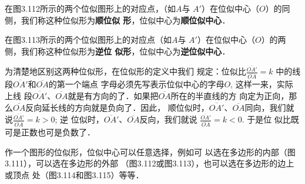 在图3.112所示的两个位似图形上的对应点，（如$A$与
$A'$）在位似中心（$O$）的同侧，我们称这种位似形为\textbf{顺位似
形}，位似中心为\textbf{顺位似中心}．

\begin{figure}[htp]
    \centering
{}
    \caption{}
\end{figure}

\begin{figure}[htp]
    \centering
{}
    \caption{}
\end{figure}

在图3.113所示的两个位似图形上的对应点（如$A$与
$A'$）在位似中心（$O$）的两侧，我们称这种位似形为\textbf{逆位
似形}，位似中心为\textbf{逆位似中心}．
    
为清楚地区别这两种位似形，在位似形的定义中我们
规定：位似比$\frac{\overline{OA'}}{\overline{OA}}=k$
中的线段$\overline{OA'}$和$\overline{OA}$的第一个端点
字母必须先写表示位似中心的字母$O$, 这样一来，实际上线
段$\overline{OA'}$、$\overline{OA}$就是有方向的了．如果把$\overline{OA}$所在的半直线的方
向定为正向，那么$\overline{OA}$反向延长线的方向就是负向了．因此，
顺位似时，$\overline{OA'}$、$\overline{OA}$同向，我们就说$\frac{\overline{OA'}}{\overline{OA}}=k>0$; 逆
位似时，$\overline{OA'}$、$\overline{OA}$反向，我们就说
$\frac{\overline{OA'}}{\overline{OA}}=k<0$. 于是位
似比既可是正数也可是负数了．

作一个图形的位似形，位似中心可以任意选择，例如可
以选在多边形的内部（图3.111），可以选在多边形的外部
（图3.112或图3.113），也可以选在多边形的边上或顶点
处（图3.114和图3.115）等等．

